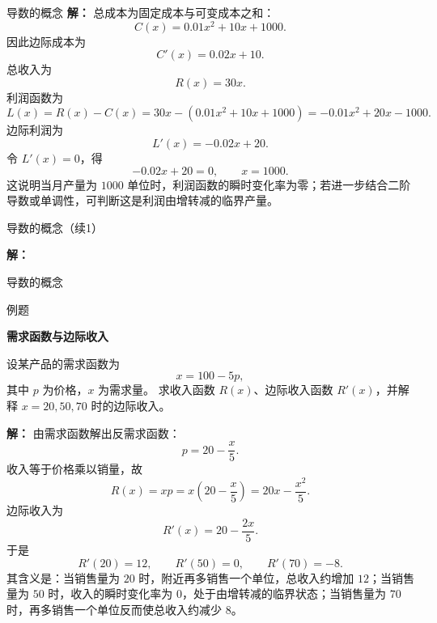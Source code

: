 \documentclass[aspectratio=169,10pt,fontset=fandol]{ctexbeamer}
\begin{document}
\begin{frame}[t,fragile]{导数的概念}
\footnotesize
{\footnotesize
\textbf{解：}
总成本为固定成本与可变成本之和：
\[
C(x)=0.01x^2+10x+1000.
\]
因此边际成本为
\[
C'(x)=0.02x+10.
\]
总收入为
\[
R(x)=30x.
\]
利润函数为
\[
L(x)=R(x)-C(x)=30x-(0.01x^2+10x+1000)
=-0.01x^2+20x-1000.
\]
边际利润为
\[
L'(x)=-0.02x+20.
\]
令 $L'(x)=0$，得
\[
-0.02x+20=0,\qquad x=1000.
\]
这说明当月产量为 $1000$ 单位时，利润函数的瞬时变化率为零；若进一步结合二阶导数或单调性，可判断这是利润由增转减的临界产量。
}
\end{frame}
\begin{frame}[t,fragile]{导数的概念（续1）}
\footnotesize
{\footnotesize
\textbf{解：}


}
\end{frame}
\begin{frame}[t,fragile]{导数的概念}
\footnotesize
\begin{block}{例题}
{\footnotesize
\textbf{需求函数与边际收入}\par

设某产品的需求函数为
\[
x=100-5p,
\]
其中 $p$ 为价格，$x$ 为需求量。 求收入函数 $R(x)$、边际收入函数 $R'(x)$，并解释 $x=20,50,70$ 时的边际收入。

}
\end{block}
\pause
{\footnotesize
\textbf{解：}
由需求函数解出反需求函数：
\[
p=20-\frac{x}{5}.
\]
收入等于价格乘以销量，故
\[
R(x)=xp=x\left(20-\frac{x}{5}\right)=20x-\frac{x^2}{5}.
\]
边际收入为
\[
R'(x)=20-\frac{2x}{5}.
\]
于是
\[
R'(20)=12,\qquad R'(50)=0,\qquad R'(70)=-8.
\]
其含义是：当销售量为 $20$ 时，附近再多销售一个单位，总收入约增加 $12$；当销售量为 $50$ 时，收入的瞬时变化率为 $0$，处于由增转减的临界状态；当销售量为 $70$ 时，再多销售一个单位反而使总收入约减少 $8$。

}
\end{frame}
\end{document}
